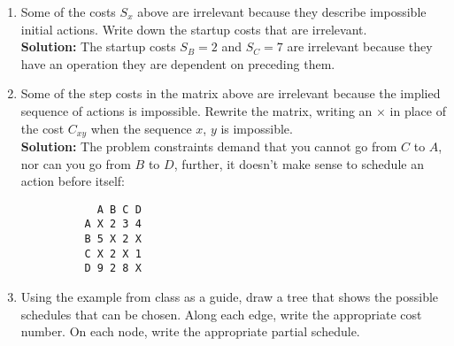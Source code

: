 \documentclass[11pts]{article}
\begin{document}
\begin{enumerate}
  \item Some of the costs $S_{x}$ above are irrelevant because they describe
        impossible initial actions. Write down the startup costs that
        are irrelevant. \\

        \textbf{Solution:} The startup costs $S_{B} = 2$ and $S_{C} = 7$ are
        irrelevant because they have an operation they are dependent on
        preceding them.\\

  \item Some of the step costs in the matrix above are irrelevant because
        the implied sequence of actions is impossible. Rewrite the
        matrix, writing an × in place of the cost $C_{xy}$ when the sequence
        $x$, $y$ is impossible. \\

        \textbf{Solution:}
	The problem constraints demand that you cannot go from $C$ to $A$, nor
        can you go from $B$ to $D$, further, it doesn't make sense to schedule
        an action before itself: 
          \begin{verbatim}
            A B C D
          A X 2 3 4
          B 5 X 2 X
          C X 2 X 1
          D 9 2 8 X
          \end{verbatim}
\newpage
  \item Using the example from class as a guide, draw a tree that shows
        the possible schedules that can be chosen. Along each edge, write
        the appropriate cost number. On each node, write the appropriate
        partial schedule. \\


\end{enumerate}
\end{document}
